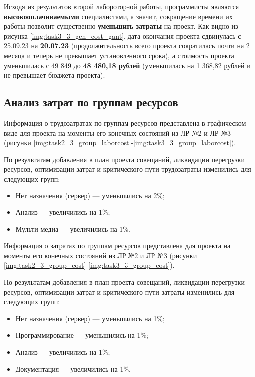 Исходя из результатов второй лабороторной работы, программисты являются \textbf{высокооплачиваемыми} специалистами, а значит, сокращение времени их работы позволит существенно \textbf{уменьшить затраты} на проект. Как видно из рисунка \ref{img:task3_3_gen_cost_gant}, дата окончания проекта сдвинулась с 25.09.23 на \textbf{20.07.23} (продолжительность всего проекта сократилась почти на 2 месяца и теперь не превышает установленного срока), а стоимость проекта уменьшилась с 49 849 до \textbf{48 480,18 рублей} (уменьшилась на 1 368,82 рублей и не превышает бюджета проекта).

\subsection{Анализ затрат по группам ресурсов}

Информация о трудозатратах по группам ресурсов представлена в 
графическом виде для проекта на моменты его конечных состояний из ЛР №2 и ЛР №3 (рисунки \ref{img:task2_3_group_laborcost}-\ref{img:task3_3_group_laborcost}).


\newpage
По результатам добавления в план проекта совещаний, ликвидации перегрузки ресурсов, оптимизации затрат и критического пути трудозатраты изменились для следующих групп:
\begin{itemize}[label = ---]
	\item Нет назначения (сервер) --- уменьшились на 2\%;
	\item Анализ --- увеличились на 1\%;
	\item Мульти-медиа --- увеличились на 1\%.
\end{itemize}

Информация о затратах по группам ресурсов представлена для проекта на моменты его конечных состояний из ЛР №2 и ЛР №3 (рисунки \ref{img:task2_3_group_cost}-\ref{img:task3_3_group_cost}).


\newpage
По результатам добавления в план проекта совещаний, ликвидации перегрузки ресурсов, оптимизации затрат и критического пути затраты изменились для следующих групп:
\begin{itemize}[label = ---]
	\item Нет назначения (сервер) --- уменьшились на 1\%;
	\item Программирование --- уменьшились на 1\%;
	\item Анализ --- увеличились на 1\%;
	\item Документация --- увеличились на 1\%.
\end{itemize}

